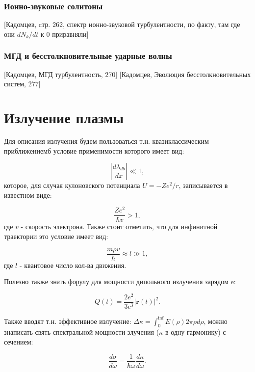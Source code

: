 \documentclass[10pt, a4paper]{article}
\let\stdsection\section
\renewcommand\section{\newpage\stdsection}
\begin{document}
\subsubsection{Ионно-звуковые солитоны}
[Кадомцев, cтр. 262, спектр ионно-звуковой турбулентности, по факту, там где они $dN_k/dt$ к 0 приравняли]


\subsubsection{МГД и бесстолкновительные ударные волны}
[Кадомцев, МГД турбулентность, 270]
[Кадомцев, Эволюция бесстолкновительных систем,  277]


\section{Излучение плазмы} \label{sec:radiation_extra}

Для описания излучения будем пользоваться т.н. квазиклассическим приближениемб условие применимости которого имеет вид:

\begin{equation}
    |\frac{d \lambda_{db}}{dx}|\ll 1,
\end{equation}
которое, для случая кулоновского потенциала $U=-Ze^2/r$, записывается в известном виде:

\begin{equation}
    \frac{Ze^2}{\hbar v} > 1,
\end{equation}
где $v$ - скорость электрона. Также стоит отметить, что для инфинитной траектории это условие имеет вид:

\begin{equation}
    \frac{m \rho v}{\hbar} \approx l \gg 1,
\end{equation}
где $l$ - квантовое число кол-ва движения.

Полезно также знать форулу для мощности дипольного излучения зарядом e:

\begin{equation}
    Q(t) = \frac{2e^2}{3c^3}|\ddot{\mathbf{r}}(t)|^2.
\end{equation}

Также вводят т.н. эффективное излучение: $\Delta \kappa = \int_0^{\inf} E(\rho) 2\pi \rho d\rho$, можно знаписать свять
спектральной мощности злучения ($\kappa$ в одну гармонику) с сечением:

\begin{equation}
    \frac{d\sigma}{d\omega}=\frac{1}{\hbar\omega} \frac{d\kappa}{d\omega}.
\end{equation}
\end{document}
